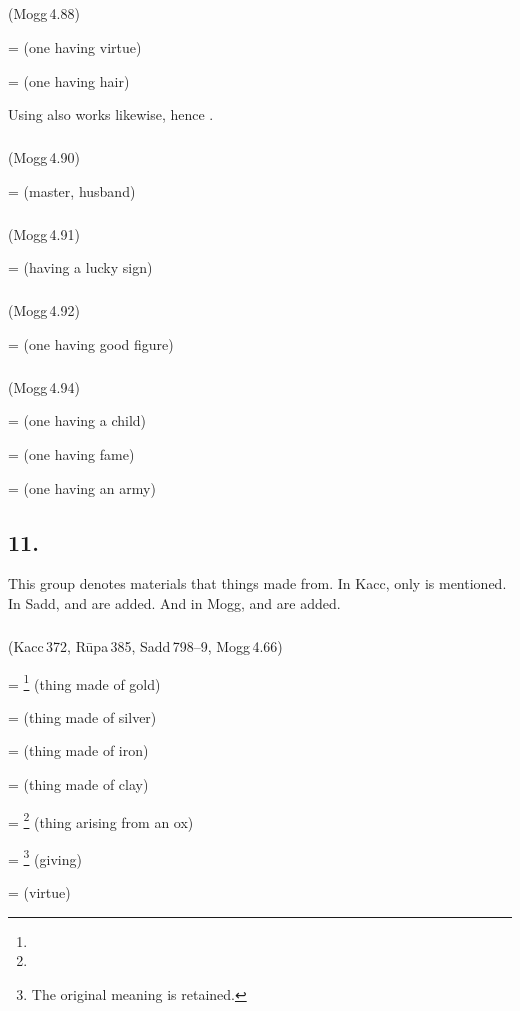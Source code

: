 \subparagraph*{} (Mogg\,4.88)\label{pacct10:va}

 =  (one having virtue) \par
{} =  (one having hair) \par
Using  also works likewise, hence .

\subparagraph*{} (Mogg\,4.90)\label{pacct10:aamii}\label{pacct10:uvaamii}

 =  (master, husband) \par

\subparagraph*{} (Mogg\,4.91)\label{pacct10:M-dna}

 =  (having a lucky sign) \par

\subparagraph*{} (Mogg\,4.92)\label{pacct10:na}

 =  (one having good figure) \par

\subparagraph*{} (Mogg\,4.94)\label{pacct10:ima}\label{pacct10:iya}

 =  (one having a child) \par
{} =  (one having fame) \par
{} =  (one having an army) \par

\subsection*{11.\ }\label{tadgroup11}

This group denotes materials that things made from. In Kacc, only  is mentioned. In Sadd,  and  are added. And in Mogg,  and  are added.

\subparagraph*{} (Kacc\,372, R\=upa\,385, Sadd\,798--9, Mogg\,4.66)\label{pacct11:maya}

 = \footnote{} (thing made of gold) \par
{} =  (thing made of silver) \par
{} =  (thing made of iron) \par
{} =  (thing made of clay) \par
{} = \footnote{} (thing arising from an ox) \par
{} = \footnote{ The original meaning is retained.} (giving) \par
{} =  (virtue) \par


